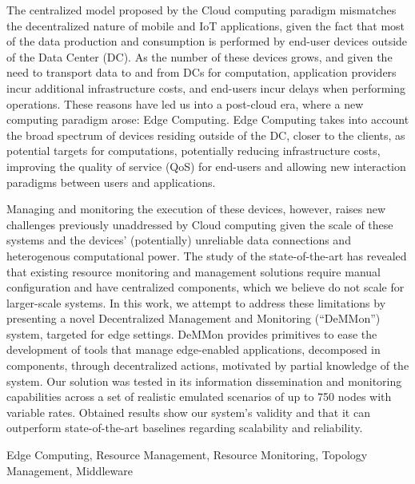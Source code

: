

The centralized model proposed by the Cloud computing paradigm mismatches the decentralized nature of mobile and IoT applications, given the fact that most of the data production and consumption is performed by end-user devices outside of the Data Center (DC). As the number of these devices grows, and given the need to transport data to and from DCs for computation, application providers incur additional infrastructure costs, and end-users incur delays when performing operations. These reasons have led us into a post-cloud era, where a new computing paradigm arose: Edge Computing. Edge Computing takes into account the broad spectrum of devices residing outside of the DC, closer to the clients, as potential targets for computations, potentially reducing infrastructure costs, improving the quality of service (QoS) for end-users and allowing new interaction paradigms between users and applications. 

Managing and monitoring the execution of these devices, however, raises new challenges previously unaddressed by Cloud computing given the scale of these systems and the devices' (potentially) unreliable data connections and heterogenous computational power. The study of the state-of-the-art has revealed that existing resource monitoring and management solutions require manual configuration and have centralized components, which we believe do not scale for larger-scale systems. In this work, we attempt to address these limitations by presenting a novel Decentralized Management and Monitoring (``DeMMon'') system, targeted for edge settings. DeMMon provides primitives to ease the development of tools that manage edge-enabled applications, decomposed in components, through decentralized actions, motivated by partial knowledge of the system. Our solution was tested in its information dissemination and monitoring capabilities across a set of realistic emulated scenarios of up to 750 nodes with variable rates. Obtained results show our system's validity and that it can outperform state-of-the-art baselines regarding scalability and reliability. 


\begin{keywords}
  Edge Computing, Resource Management, Resource Monitoring, Topology Management, Middleware
\end{keywords} 
